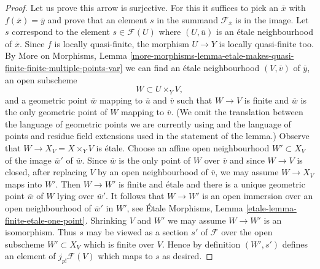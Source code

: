 \documentclass{stacks-project}
\theoremstyle{plain}
\theoremstyle{definition}
\theoremstyle{remark}
\numberwithin{equation}{subsection}
\begin{document}
\begin{proof}
\medskip\noindent
Let us prove this arrow is surjective. For this it suffices to pick
an $\overline{x}$ with $f(\overline{x}) = \overline{y}$ and prove that
an element $s$ in the summand $\mathcal{F}_{\overline{x}}$ is in the
image. Let $s$ correspond to the element $s \in \mathcal{F}(U)$
where $(U, \overline{u})$ is an \'etale neighbourhood of $\overline{x}$.
Since $f$ is locally quasi-finite, the morphism $U \to Y$
is locally quasi-finite too. By More on Morphisms, Lemma
\ref{more-morphisms-lemma-etale-makes-quasi-finite-finite-multiple-points-var}
we can find an \'etale neighbourhood $(V, \overline{v})$ of
$\overline{y}$, an open subscheme
$$
W \subset U \times_Y V,
$$
and a geometric point $\overline{w}$ mapping to $\overline{u}$ and
$\overline{v}$ such that $W \to V$ is finite and $\overline{w}$ is the
only geometric point of $W$ mapping to $\overline{v}$. (We omit the translation
between the language of geometric points we are currently using and the
language of points and residue field extensions used in the
statement of the lemma.) Observe that $W \to X_V = X \times_Y V$
is \'etale. Choose an affine open neighbourhood $W' \subset X_V$
of the image $\overline{w}'$ of $\overline{w}$. Since $\overline{w}$
is the only point of $W$ over $\overline{v}$ and since $W \to V$
is closed, after replacing $V$ by an open neighbourhood of $\overline{v}$,
we may assume $W \to X_V$ maps into $W'$. Then $W \to W'$ is finite and
\'etale and there is a unique geometric point $\overline{w}$ of $W$
lying over $\overline{w}'$. It follows that $W \to W'$ is an open immersion
over an open neighbourhood of $\overline{w}'$ in $W'$, see
\'Etale Morphisms, Lemma \ref{etale-lemma-finite-etale-one-point}.
Shrinking $V$ and $W'$ we may assume $W \to W'$ is an isomorphism.
Thus $s$ may be viewed as a section $s'$ of $\mathcal{F}$ over
the open subscheme $W' \subset X_V$ which is finite over $V$.
Hence by definition $(W', s')$ defines an element of $j_{p!}\mathcal{F}(V)$
which maps to $s$ as desired.


\end{proof}
\end{document}
